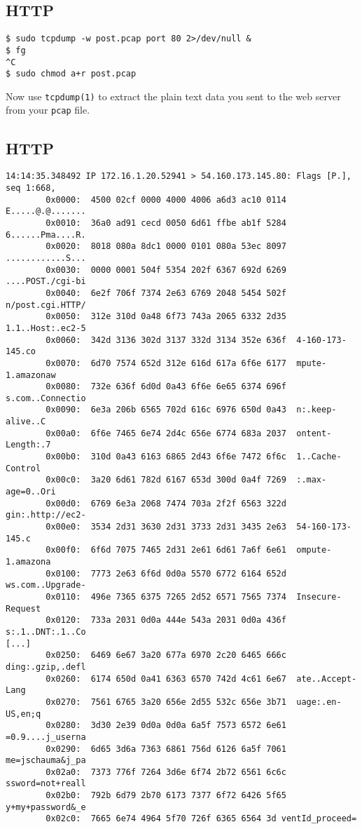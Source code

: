 \documentclass[xga]{xdvislides}
\begin{document}
\subsection{HTTP}
\begin{verbatim}
$ sudo tcpdump -w post.pcap port 80 2>/dev/null &
$ fg
^C
$ sudo chmod a+r post.pcap
\end{verbatim}

Now use {\tt tcpdump(1)} to extract the plain text data you sent
to the web server from your {\tt pcap} file.


\subsection{HTTP}
\small
\begin{verbatim}
14:14:35.348492 IP 172.16.1.20.52941 > 54.160.173.145.80: Flags [P.], seq 1:668,
        0x0000:  4500 02cf 0000 4000 4006 a6d3 ac10 0114  E.....@.@.......
        0x0010:  36a0 ad91 cecd 0050 6d61 ffbe ab1f 5284  6......Pma....R.
        0x0020:  8018 080a 8dc1 0000 0101 080a 53ec 8097  ............S...
        0x0030:  0000 0001 504f 5354 202f 6367 692d 6269  ....POST./cgi-bi
        0x0040:  6e2f 706f 7374 2e63 6769 2048 5454 502f  n/post.cgi.HTTP/
        0x0050:  312e 310d 0a48 6f73 743a 2065 6332 2d35  1.1..Host:.ec2-5
        0x0060:  342d 3136 302d 3137 332d 3134 352e 636f  4-160-173-145.co
        0x0070:  6d70 7574 652d 312e 616d 617a 6f6e 6177  mpute-1.amazonaw
        0x0080:  732e 636f 6d0d 0a43 6f6e 6e65 6374 696f  s.com..Connectio
        0x0090:  6e3a 206b 6565 702d 616c 6976 650d 0a43  n:.keep-alive..C
        0x00a0:  6f6e 7465 6e74 2d4c 656e 6774 683a 2037  ontent-Length:.7
        0x00b0:  310d 0a43 6163 6865 2d43 6f6e 7472 6f6c  1..Cache-Control
        0x00c0:  3a20 6d61 782d 6167 653d 300d 0a4f 7269  :.max-age=0..Ori
        0x00d0:  6769 6e3a 2068 7474 703a 2f2f 6563 322d  gin:.http://ec2-
        0x00e0:  3534 2d31 3630 2d31 3733 2d31 3435 2e63  54-160-173-145.c
        0x00f0:  6f6d 7075 7465 2d31 2e61 6d61 7a6f 6e61  ompute-1.amazona
        0x0100:  7773 2e63 6f6d 0d0a 5570 6772 6164 652d  ws.com..Upgrade-
        0x0110:  496e 7365 6375 7265 2d52 6571 7565 7374  Insecure-Request
        0x0120:  733a 2031 0d0a 444e 543a 2031 0d0a 436f  s:.1..DNT:.1..Co
[...]
        0x0250:  6469 6e67 3a20 677a 6970 2c20 6465 666c  ding:.gzip,.defl
        0x0260:  6174 650d 0a41 6363 6570 742d 4c61 6e67  ate..Accept-Lang
        0x0270:  7561 6765 3a20 656e 2d55 532c 656e 3b71  uage:.en-US,en;q
        0x0280:  3d30 2e39 0d0a 0d0a 6a5f 7573 6572 6e61  =0.9....j_userna
        0x0290:  6d65 3d6a 7363 6861 756d 6126 6a5f 7061  me=jschauma&j_pa
        0x02a0:  7373 776f 7264 3d6e 6f74 2b72 6561 6c6c  ssword=not+reall
        0x02b0:  792b 6d79 2b70 6173 7377 6f72 6426 5f65  y+my+password&_e
        0x02c0:  7665 6e74 4964 5f70 726f 6365 6564 3d ventId_proceed=

\end{verbatim}
\Normalsize
\end{document}

